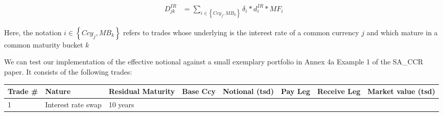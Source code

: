 \begin{align*}
D_{jk}^{IR} &= \sum_{i\in\left\{Ccy_j, MB_k\right\}}{\delta_i*d_i^{IR}*MF_i}
\end{align*}

Here, the notation \(i\in\left\{Ccy_j, MB_k\right\}\) refers to trades
whose underlying is the interest rate of a common currency \(j\) and
which mature in a common maturity bucket \(k\)

    We can test our implementation of the effective notional against a small
exemplary portfolio in Annex 4a Example 1 of the SA\_CCR paper. It
consists of the following trades:

\begin{longtable}[]{@{}llllllll@{}}
\toprule
\begin{minipage}[b]{0.04\columnwidth}\raggedright
Trade \#\strut
\end{minipage} & \begin{minipage}[b]{0.10\columnwidth}\raggedright
Nature\strut
\end{minipage} & \begin{minipage}[b]{0.09\columnwidth}\raggedright
Residual Maturity\strut
\end{minipage} & \begin{minipage}[b]{0.07\columnwidth}\raggedright
Base Ccy\strut
\end{minipage} & \begin{minipage}[b]{0.11\columnwidth}\raggedright
Notional (tsd)\strut
\end{minipage} & \begin{minipage}[b]{0.11\columnwidth}\raggedright
Pay Leg\strut
\end{minipage} & \begin{minipage}[b]{0.13\columnwidth}\raggedright
Receive Leg\strut
\end{minipage} & \begin{minipage}[b]{0.13\columnwidth}\raggedright
Market value (tsd)\strut
\end{minipage}\tabularnewline
\midrule
\endhead
\begin{minipage}[t]{0.04\columnwidth}\raggedright
1\strut
\end{minipage} & \begin{minipage}[t]{0.10\columnwidth}\raggedright
Interest rate swap\strut
\end{minipage} & \begin{minipage}[t]{0.09\columnwidth}\raggedright
10 years\strut
\end{minipage} & \begin{minipage}[t]{0.07\columnwidth}\raggedright

\end{minipage}
\end{longtable}
